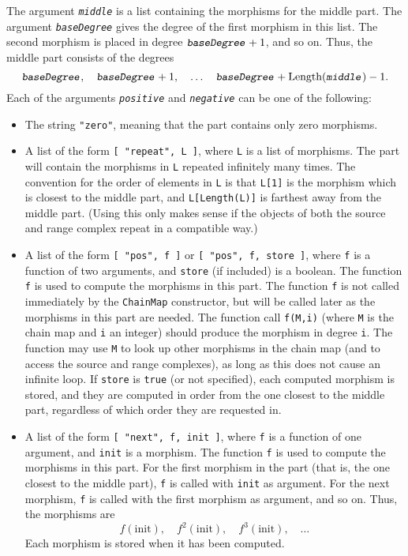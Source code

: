 \documentclass[a4paper,11pt]{report}
\begin{document}
{{{ The argument \mbox{\texttt{\slshape middle}} is a list containing the morphisms for the middle part. The argument \mbox{\texttt{\slshape baseDegree}} gives the degree of the first morphism in this list. The second morphism is
placed in degree $\mbox{\texttt{\slshape baseDegree}}+1$, and so on. Thus, the middle part consists of the degrees 
\[ \mbox{\texttt{\slshape baseDegree}},\quad \mbox{\texttt{\slshape baseDegree}} + 1,\quad \ldots\quad \mbox{\texttt{\slshape baseDegree}} + \text{Length}(\mbox{\texttt{\slshape middle}}) - 1. \]
 Each of the arguments \mbox{\texttt{\slshape positive}} and \mbox{\texttt{\slshape negative}} can be one of the following: 
\begin{itemize}
\item The string \texttt{"zero"}, meaning that the part contains only zero morphisms.
\item A list of the form \texttt{[ "repeat", L ]}, where \texttt{L} is a list of morphisms. The part will contain the morphisms in \texttt{L} repeated infinitely many times. The convention for the order of elements in \texttt{L} is that \texttt{L[1]} is the morphism which is closest to the middle part, and \texttt{L[Length(L)]} is farthest away from the middle part. (Using this only makes sense if the
objects of both the source and range complex repeat in a compatible way.)
\item A list of the form \texttt{[ "pos", f ]} or \texttt{[ "pos", f, store ]}, where \texttt{f} is a function of two arguments, and \texttt{store} (if included) is a boolean. The function \texttt{f} is used to compute the morphisms in this part. The function \texttt{f} is not called immediately by the \texttt{ChainMap} constructor, but will be called later as the morphisms in this part are
needed. The function call \texttt{f(M,i)} (where \texttt{M} is the chain map and \texttt{i} an integer) should produce the morphism in degree \texttt{i}. The function may use \texttt{M} to look up other morphisms in the chain map (and to access the source and
range complexes), as long as this does not cause an infinite loop. If \texttt{store} is \texttt{true} (or not specified), each computed morphism is stored, and they are computed in
order from the one closest to the middle part, regardless of which order they
are requested in.
\item A list of the form \texttt{[ "next", f, init ]}, where \texttt{f} is a function of one argument, and \texttt{init} is a morphism. The function \texttt{f} is used to compute the morphisms in this part. For the first morphism in the
part (that is, the one closest to the middle part), \texttt{f} is called with \texttt{init} as argument. For the next morphism, \texttt{f} is called with the first morphism as argument, and so on. Thus, the morphisms
are 
\[ f(\text{init}),\quad f^2(\text{init}),\quad f^3(\text{init}),\quad \ldots \]
 Each morphism is stored when it has been computed. 
\end{itemize}
 }

}}
\end{document}
